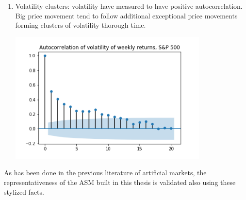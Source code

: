 \begin{enumerate}
    \item Volatility clusters: volatility have measured to have positive autocorrelation. Big price movement tend to follow additional exceptional price movements forming clusters of volatility thorough time.
    \par
    \begin{minipage}{\linewidth}
        \centering
        \includegraphics[width=10cm]{plots/S&P500_vola_autocorr.png}
    \end{minipage}
\end{enumerate} 


As has been done in the previous literature of artificial markets, the 
representativeness of the ASM built in this thesis is validated also 
using these stylized facts.